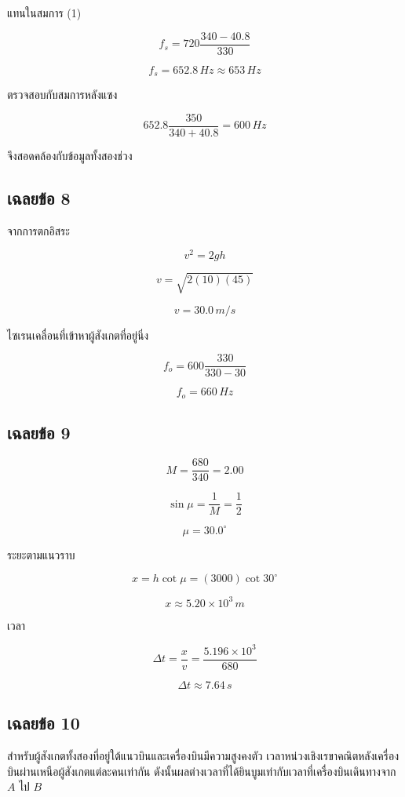 แทนในสมการ (1)

\[
f_s
=720\frac{340-40.8}{330}
\]

\[
\boxed{f_s=652.8\,\si{Hz}\approx653\,\si{Hz}}
\]

ตรวจสอบกับสมการหลังแซง

\[
652.8\frac{350}{340+40.8}=600\,\si{Hz}
\]

จึงสอดคล้องกับข้อมูลทั้งสองช่วง

\subsection*{เฉลยข้อ 8}

จากการตกอิสระ

\[
v^2=2gh
\]

\[
v=\sqrt{2(10)(45)}
\]

\[
\boxed{v=30.0\,\si{m/s}}
\]

ไซเรนเคลื่อนที่เข้าหาผู้สังเกตที่อยู่นิ่ง

\[
f_o=600\frac{330}{330-30}
\]

\[
\boxed{f_o=660\,\si{Hz}}
\]

\subsection*{เฉลยข้อ 9}

\[
M=\frac{680}{340}=2.00
\]

\[
\sin\mu=\frac{1}{M}=\frac{1}{2}
\]

\[
\boxed{\mu=30.0^\circ}
\]

ระยะตามแนวราบ

\[
x=h\cot\mu
=(3000)\cot30^\circ
\]

\[
\boxed{x\approx5.20\times10^3\,\si{m}}
\]

เวลา

\[
\Delta t=\frac{x}{v}
=\frac{5.196\times10^3}{680}
\]

\[
\boxed{\Delta t\approx7.64\,\si{s}}
\]

\subsection*{เฉลยข้อ 10}

สำหรับผู้สังเกตทั้งสองที่อยู่ใต้แนวบินและเครื่องบินมีความสูงคงตัว เวลาหน่วงเชิงเรขาคณิตหลังเครื่องบินผ่านเหนือผู้สังเกตแต่ละคนเท่ากัน ดังนั้นผลต่างเวลาที่ได้ยินบูมเท่ากับเวลาที่เครื่องบินเดินทางจาก $A$ ไป $B$

